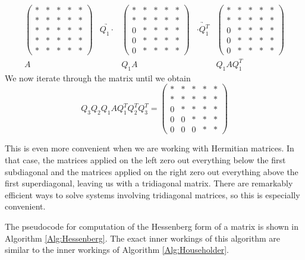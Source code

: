 \[
\begin{array}{ccccc}
\begin{pmatrix}
* & * & * & * & * \\
* & * & * & * & * \\
* & * & * & * & * \\
* & * & * & * & * \\
* & * & * & * & *
\end{pmatrix} 
&\underrightarrow{Q_1 \cdot }&
\begin{pmatrix}
* & * & * & * & * \\
* & * & * & * & * \\
0 & * & * & * & * \\
0 & * & * & * & * \\
0 & * & * & * & *
\end{pmatrix} 
&\underrightarrow{\cdot Q_1^T }&
\begin{pmatrix}
* & * & * & * & * \\
* & * & * & * & * \\
0 & * & * & * & * \\
0 & * & * & * & * \\
0 & * & * & * & *
\end{pmatrix}
\\ 
A & & Q_1A & & Q_1 A Q_1^T
  \end{array}
\]
We now iterate through the matrix until we obtain
\begin{equation*}
Q_3 Q_2 Q_1 A Q_1^T Q_2 ^T Q_3^T = 
\begin{pmatrix}
* & * & * & * & * \\
* & * & * & * & * \\
0 & * & * & * & * \\
0 & 0 & * & * & * \\
0 & 0 & 0 & * & *
\end{pmatrix}
\end{equation*}

This is even more convenient when we are working with Hermitian matrices.
In that case, the matrices applied on the left zero out everything below the first subdiagonal and the matrices applied on the right zero out everything above the first superdiagonal, leaving us with a tridiagonal matrix.
There are remarkably efficient ways to solve systems involving tridiagonal matrices, so this is especially convenient.

The pseudocode for computation of the Hessenberg form of a matrix is shown in Algorithm \ref{Alg:Hessenberg}.
The exact inner workings of this algorithm are similar to the inner workings of Algorithm \ref{Alg:Householder}.


